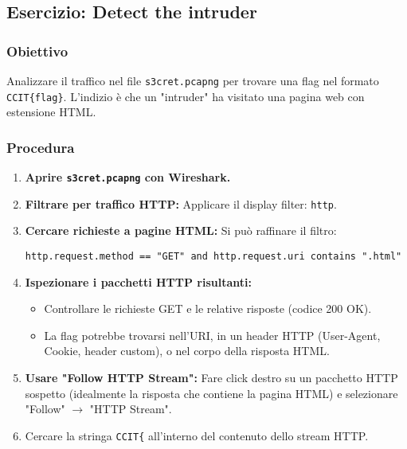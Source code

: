 \subsection{Esercizio: Detect the intruder}
\subsubsection{Obiettivo}
Analizzare il traffico nel file \texttt{s3cret.pcapng} per trovare una flag nel formato \texttt{CCIT\{flag\}}. L'indizio è che un "intruder" ha visitato una pagina web con estensione HTML.

\subsubsection{Procedura}
\begin{enumerate}
    \item \textbf{Aprire \texttt{s3cret.pcapng} con Wireshark.}
    \item \textbf{Filtrare per traffico HTTP:}
    Applicare il display filter: \texttt{http}.
    \item \textbf{Cercare richieste a pagine HTML:}
    Si può raffinare il filtro:
    \begin{verbatim}
http.request.method == "GET" and http.request.uri contains ".html"
    \end{verbatim}
    \item \textbf{Ispezionare i pacchetti HTTP risultanti:}
    \begin{itemize}
        \item Controllare le richieste GET e le relative risposte (codice 200 OK).
        \item La flag potrebbe trovarsi nell'URI, in un header HTTP (User-Agent, Cookie, header custom), o nel corpo della risposta HTML.
    \end{itemize}
    \item \textbf{Usare "Follow HTTP Stream":}
    Fare click destro su un pacchetto HTTP sospetto (idealmente la risposta che contiene la pagina HTML) e selezionare "Follow" $\rightarrow$ "HTTP Stream".
    \item Cercare la stringa \texttt{CCIT\{} all'interno del contenuto dello stream HTTP.
\end{enumerate}

\newpage
